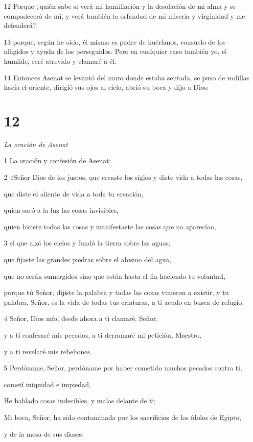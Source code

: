 \par 12 Porque ¿quién sabe si verá mi humillación y la desolación de mi alma y se compadecerá de mí, y verá también la orfandad de mi miseria y virginidad y me defenderá?

\par 13 porque, según he oído, él mismo es padre de huérfanos, consuelo de los afligidos y ayuda de los perseguidos. Pero en cualquier caso también yo, el humilde, seré atrevido y clamaré a él.

\par 14 Entonces Asenat se levantó del muro donde estaba sentada, se puso de rodillas hacia el oriente, dirigió sus ojos al cielo, abrió su boca y dijo a Dios:

\chapter{12}

\par \textit{La oración de Asenat}

\par 1 La oración y confesión de Asenat:

\par 2 «Señor Dios de los justos, que creaste los siglos y diste vida a todas las cosas,
\par que diste el aliento de vida a toda tu creación,
\par quien sacó a la luz las cosas invisibles,
\par quien hiciste todas las cosas y manifestaste las cosas que no aparecían,

\par 3 el que alzó los cielos y fundó la tierra sobre las aguas,
\par que fijaste las grandes piedras sobre el abismo del agua,
\par que no serán sumergidos sino que están hasta el fin haciendo tu voluntad,
\par porque tú Señor, dijiste la palabra y todas las cosas vinieron a existir, y tu palabra, Señor, es la vida de todas tus criaturas, a ti acudo en busca de refugio,

\par 4 Señor, Dios mío, desde ahora a ti clamaré, Señor,
\par y a ti confesaré mis pecados, a ti derramaré mi petición, Maestro,
\par y a ti revelaré mis rebeliones.

\par 5 Perdóname, Señor, perdóname por haber cometido muchos pecados contra ti,
\par cometí iniquidad e impiedad,
\par He hablado cosas indecibles, y malas delante de ti;
\par Mi boca, Señor, ha sido contaminada por los sacrificios de los ídolos de Egipto,
\par y de la mesa de sus dioses:


